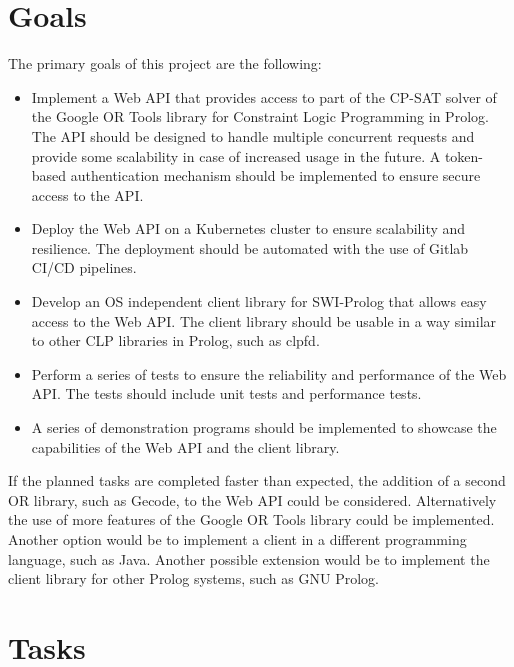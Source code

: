\documentclass[en]{customTemplate}
\begin{document}

\clearpage

\section{Goals}

The primary goals of this project are the following:

\begin{itemize}
    \item Implement a Web API that provides access to part of the CP-SAT solver of the Google OR Tools library for Constraint Logic Programming in Prolog. The API should be designed to handle multiple concurrent requests and provide some scalability in case of increased usage in the future. A token-based authentication mechanism should be implemented to ensure secure access to the API.
    \item Deploy the Web API on a Kubernetes cluster to ensure scalability and resilience. The deployment should be automated with the use of Gitlab CI/CD pipelines.
    \item Develop an OS independent client library for SWI-Prolog that allows easy access to the Web API. The client library should be usable in a way similar to other CLP libraries in Prolog, such as clpfd.
    \item Perform a series of tests to ensure the reliability and performance of the Web API. The tests should include unit tests and performance tests.
    \item A series of demonstration programs should be implemented to showcase the capabilities of the Web API and the client library.
\end{itemize}

If the planned tasks are completed faster than expected, the addition of a second OR library, such as Gecode, to the Web API could be considered. Alternatively the use of more features of the Google OR Tools library could be implemented. Another option would be to implement a client in a different programming language, such as Java. Another possible extension would be to implement the client library for other Prolog systems, such as GNU Prolog.

\clearpage

\section{Tasks}
\end{document}

